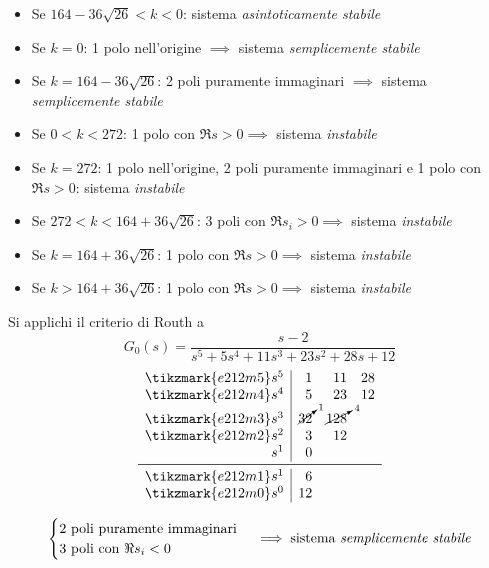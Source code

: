 \begin{esercizio}[Parametrico]
\begin{itemize}
	\item Se \(164-36\sqrt{26} < k < 0\): sistema \emph{asintoticamente stabile}
	\item Se \(k = 0\): 1 polo nell'origine \(\implies\) sistema \emph{semplicemente stabile}
	\item Se \(k = 164-36\sqrt{26}\): 2 poli puramente immaginari \(\implies\) sistema \emph{semplicemente stabile}
	\item Se \(0 < k < 272\): 1 polo con \(\Re s > 0 \implies\) sistema \emph{instabile}
	\item Se \(k = 272\): 1 polo nell'origine, 2 poli puramente immaginari e 1 polo con \(\Re s > 0\): sistema \emph{instabile}
	\item Se \(272 < k < 164+36\sqrt{26}\): 3 poli con \(\Re s_i > 0 \implies\) sistema \emph{instabile}
	\item Se \(k = 164+36\sqrt{26}\): 1 polo con \(\Re s > 0 \implies\) sistema \emph{instabile}
	\item Se \(k > 164+36\sqrt{26}\): 1 polo con \(\Re s > 0 \implies\) sistema \emph{instabile}
\end{itemize}
\end{esercizio}

\begin{esercizio} Si applichi il criterio di Routh a
\[
	G_0(s) = \frac{s-2}{s^5 +5s^4 +11s^3 +23s^2 +28s +12}
\]
\[\begin{array}{r|rrr}
	\tikzmark{e212m5} s^5 & 1 & 11 & 28 \\
	\tikzmark{e212m4} s^4 & 5 & 23 & 12 \\
	\tikzmark{e212m3} s^3 & \cancelto{1}{32} & \cancelto{4}{128} \\
	\tikzmark{e212m2} s^2 & 3 & 12	   \\
			 s^1 & 0	   \\
	\midrule
	\tikzmark{e212m1} s^1 & 6	   \\
	\tikzmark{e212m0} s^0 & 12
\end{array}\]
\[\begin{cases}
	2 \text{ poli puramente immaginari} \\
	3 \text{ poli con } \Re s_i < 0
\end{cases} \implies \text{sistema \emph{semplicemente stabile}}\]
\end{esercizio}
